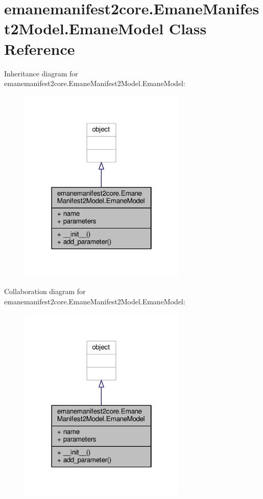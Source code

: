 \hypertarget{classemanemanifest2core_1_1_emane_manifest2_model_1_1_emane_model}{\section{emanemanifest2core.\+Emane\+Manifest2\+Model.\+Emane\+Model Class Reference}
\label{classemanemanifest2core_1_1_emane_manifest2_model_1_1_emane_model}
}


Inheritance diagram for emanemanifest2core.\+Emane\+Manifest2\+Model.\+Emane\+Model\+:
\nopagebreak
\begin{figure}[H]
\begin{center}
\leavevmode
\includegraphics[width=226pt]{classemanemanifest2core_1_1_emane_manifest2_model_1_1_emane_model__inherit__graph}
\end{center}
\end{figure}


Collaboration diagram for emanemanifest2core.\+Emane\+Manifest2\+Model.\+Emane\+Model\+:
\nopagebreak
\begin{figure}[H]
\begin{center}
\leavevmode
\includegraphics[width=226pt]{classemanemanifest2core_1_1_emane_manifest2_model_1_1_emane_model__coll__graph}
\end{center}
\end{figure}
